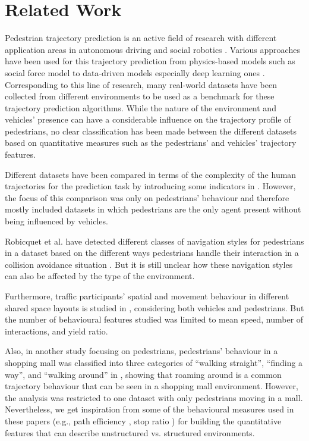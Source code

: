 \section{Related Work}
Pedestrian trajectory prediction is an active field of research with different application areas in autonomous driving and social robotics \cite{rudenko2020human}. Various approaches have been used for this trajectory prediction from physics-based models such as social force model \cite{rudenko2018joint,rinke2017multi,predhumeau2021agent} to data-driven models especially deep learning ones \cite{salzmann2020trajectron++,chandra2019traphic,cheng2020mcenet}. Corresponding to this line of research, many real-world datasets have been collected from different environments to be used as a benchmark for these trajectory prediction algorithms. While the nature of the environment and vehicles' presence can have a considerable influence on the trajectory profile of pedestrians, no clear classification has been made between the different datasets based on quantitative measures such as the pedestrians’ and vehicles' trajectory features. 

Different datasets have been compared in terms of the complexity of the human trajectories for the prediction task by introducing some indicators in \cite{amirian2020opentraj}. However, the focus of this comparison was only on pedestrians’ behaviour and therefore mostly included datasets in which pedestrians are the only agent present without being influenced by vehicles. 

Robicquet et al. have detected different classes of navigation styles for pedestrians in a dataset based on the different ways pedestrians handle their interaction in a collision avoidance situation \cite{robicquet2016learning}. But it is still unclear how these navigation styles can also be affected by the type of the environment. 

Furthermore, traffic participants’ spatial and movement behaviour in different shared space layouts is studied in \cite{batista2022investigating}, considering both vehicles and pedestrians. But the number of behavioural features studied was limited to mean speed, number of interactions, and yield ratio.

Also, in another study focusing on pedestrians, pedestrians’ behaviour in a shopping mall was classified into three categories of “walking straight”,  “finding a way”, and “walking around” in \cite{okamoto2011classification}, showing that roaming around is a common trajectory behaviour that can be seen in a shopping mall environment.
However, the analysis was restricted to one dataset with only pedestrians moving in a mall. Nevertheless, we get inspiration from some of the behavioural measures used in these papers (e.g., path efficiency \cite{amirian2020opentraj}, stop ratio \cite{okamoto2011classification}) for building the quantitative features that can describe unstructured vs. structured environments.